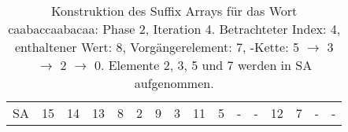 \begin{table}[H]
\begin{adjustbox}{max width=\textwidth}
\begin{tabular}{lccccccccccccccc}
\multicolumn{1}{l|}{SA}      & \multicolumn{1}{c|}{15} & 14 & \multicolumn{1}{c|}{13} & \multicolumn{1}{c|}{\cellcolor[HTML]{\green}8} & \multicolumn{1}{c|}{\cellcolor[HTML]{\red}2} & \multicolumn{1}{c|}{9}    & \multicolumn{1}{c|}{\cellcolor[HTML]{\red}3} & \multicolumn{1}{c|}{11} & \multicolumn{1}{c|}{\cellcolor[HTML]{\red}5} & -  & \multicolumn{1}{c|}{-}  & 12 & \cellcolor[HTML]{\red}7 & -  & - 
\end{tabular}
\end{adjustbox}

\caption[Konstruktion des Suffix Arrays für das Wort caabaccaabacaa: Phase 2, Iteration 4]{Konstruktion des Suffix Arrays für das Wort caabaccaabacaa: Phase 2, Iteration 4. Betrachteter Index: 4, enthaltener Wert: 8, Vorgängerelement: 7, \prevpointer-Kette: 5 $\rightarrow$ 3 $\rightarrow$ 2 $\rightarrow$ 0. Elemente 2, 3, 5 und 7 werden in SA aufgenommen.}
\label{table_complex_example_2_4} 
\end{table}

